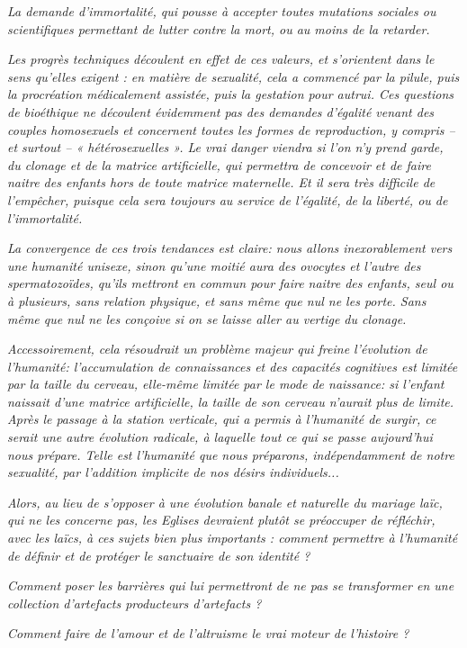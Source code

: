 \begin{displayquote}
\emph{\tertio La demande d'immortalité, qui pousse à accepter toutes mutations sociales ou scientifiques permettant de lutter contre la mort, ou au moins de la retarder.}
 
\emph{\quarto Les progrès techniques découlent en effet de ces valeurs, et s'orientent dans le sens qu'elles exigent : en matière de sexualité, cela a commencé par la pilule, puis la procréation médicalement assistée, puis la gestation pour autrui. Ces questions de bioéthique ne découlent évidemment pas des demandes d'égalité venant des couples homosexuels et concernent toutes les formes de reproduction, y compris -- et surtout -- « hétérosexuelles ». Le vrai danger viendra si l'on n'y prend garde, du clonage et de la matrice artificielle, qui permettra de concevoir et de faire naitre des enfants hors de toute matrice maternelle. Et il sera très difficile de l'empêcher, puisque cela sera toujours au service de l'égalité, de la liberté, ou de l'immortalité.}
 
\emph{ La convergence de ces trois tendances est claire: nous allons inexorablement vers une humanité unisexe, sinon qu'une moitié aura des ovocytes et l'autre des spermatozoïdes, qu'ils mettront en commun pour faire naitre des enfants, seul ou à plusieurs, sans relation physique, et sans même que nul ne les porte. Sans même que nul ne les conçoive si on se laisse aller au vertige du clonage.}
 
\emph{ Accessoirement, cela résoudrait un problème majeur qui freine l'évolution de l'humanité: l'accumulation de connaissances et des capacités cognitives est limitée par la taille du cerveau, elle-même limitée par le mode de naissance: si l'enfant naissait d'une matrice artificielle, la taille de son cerveau n'aurait plus de limite. Après le passage à la station verticale, qui a permis à l'humanité de surgir, ce serait une autre évolution radicale, à laquelle tout ce qui se passe aujourd'hui nous prépare. Telle est l'humanité que nous préparons, indépendamment de notre sexualité, par l'addition implicite de nos désirs individuels...}


\emph{Alors, au lieu de s'opposer à une évolution banale et naturelle du mariage laïc, qui ne les concerne pas, les Eglises devraient plutôt se préoccuper de réfléchir, avec les laïcs, à ces sujets bien plus importants : comment permettre à l'humanité de définir et de protéger le sanctuaire de son identité ?}

\emph{Comment poser les barrières qui lui permettront de ne pas se transformer en une collection d'artefacts producteurs d'artefacts ?}

\emph{Comment faire de l'amour et de l'altruisme le vrai moteur de l'histoire ?}


\end{displayquote}


